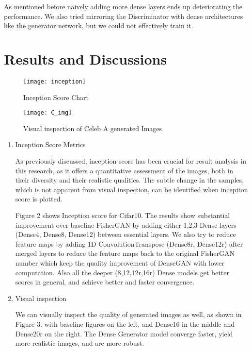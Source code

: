 \documentclass{article}
\begin{document}
As mentioned before naively adding more dense layers ends up deteriorating the performance. We also tried mirroring the Discriminator with dense architectures like the generator network, but we could not effectively train it.

\section{Results and Discussions}
\label{sec:results}

\begin{figure}
\caption{Inception Score Chart}
\texttt{[image: inception]}
\end{figure}


\begin{figure*}[h]
\caption{Visual inspection of Celeb A generated Images}
\texttt{[image: C\_img]}
\end{figure*}


\begin{enumerate}

\item Inception Score Metrics

As previously discussed, inception score has been crucial for result analysis in this research, as it offers a quantitative assessment of the images, both in their diversity and their realistic qualities. The subtle change in the samples, which is not apparent from visual inspection, can be identified when inception score is plotted. 

Figure 2 shows Inception score for Cifar10. The results show substantial improvement over baseline FisherGAN by adding either 1,2,3 Dense layers (Dense4, Dense8, Dense12) between essential layers. We also try to reduce feature maps by adding 1D ConvolutionTranspose (Dense8r, Dense12r) after merged layers to reduce the feature maps back to the original FisherGAN number which keep the quality improvement of DenseGAN with lower computation. Also all the deeper (8,12,12r,16r) Dense models get better scores in general, and achieve better and faster convergence.

\item Visual inspection

We can visually inspect the quality of generated images as well, as shown in Figure 3. with baseline figures on the left, and Dense16 in the middle and Dense20r on the right. The Dense Generator model converge faster, yield more realistic images, and are more robust.


\end{enumerate}
\end{document}
